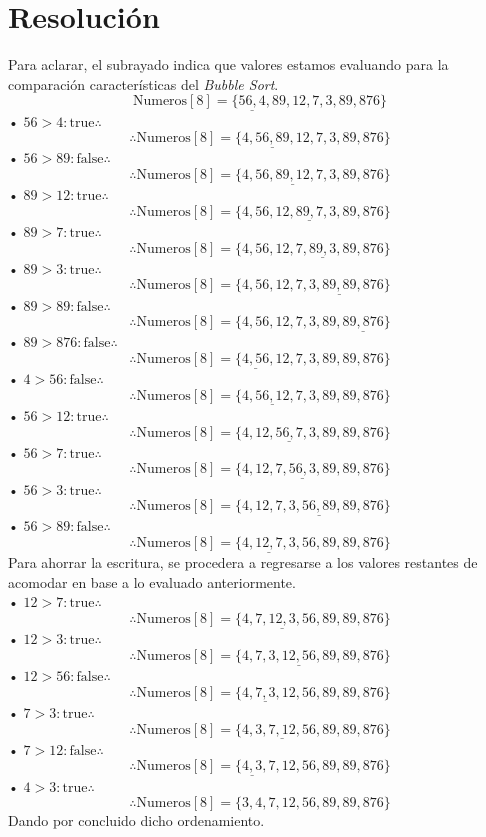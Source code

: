 \documentclass[letterpaper, 12pt]{article}
\begin{document}
    \section{Resolución}
    Para aclarar, el subrayado indica que valores estamos evaluando para la comparación características del \emph{Bubble Sort}.
    \[\text{Numeros}[8]=\{\underline{56, 4}, 89, 12, 7, 3, 89, 876\}\]
    • \(56>4: \text{true} \therefore\)
    \[\therefore \text{Numeros}[8]=\{4, \underline{56, 89}, 12, 7, 3, 89, 876\}\]
    • \(56>89: \text{false} \therefore\)
    \[\therefore \text{Numeros}[8]=\{4, 56, \underline{89, 12}, 7, 3, 89, 876\}\]
    • \(89>12: \text{true} \therefore \)
    \[\therefore \text{Numeros}[8]=\{4, 56, 12, \underline{89, 7}, 3, 89, 876\}\]
    • \(89>7: \text{true} \therefore\)
    \[\therefore \text{Numeros}[8]=\{4, 56, 12, 7, \underline{89, 3}, 89, 876\}\]
    • \(89>3: \text{true} \therefore\)
    \[\therefore \text{Numeros}[8]=\{4, 56, 12, 7, 3, \underline{89, 89}, 876\}\]
    • \(89>89: \text{false} \therefore\)
    \[\therefore \text{Numeros}[8]=\{4, 56, 12, 7, 3, 89, \underline{89, 876}\}\]
    • \(89>876: \text{false} \therefore\)
    \[\therefore \text{Numeros}[8]=\{\underline{4, 56}, 12, 7, 3, 89, 89, 876\}\]
    • \(4>56: \text{false} \therefore\)
    \[\therefore \text{Numeros}[8]=\{4, \underline{56, 12}, 7, 3, 89, 89, 876\}\]
    • \(56>12: \text{true} \therefore\)
    \[\therefore \text{Numeros}[8]=\{4, 12, \underline{56, 7}, 3, 89, 89, 876\}\]
    • \(56>7: \text{true} \therefore\)
    \[\therefore \text{Numeros}[8]=\{4, 12, 7, \underline{56, 3}, 89, 89, 876\}\]
    • \(56>3: \text{true} \therefore\)
    \[\therefore \text{Numeros}[8]=\{4, 12, 7, 3, \underline{56, 89}, 89, 876\}\]
    • \(56>89: \text{false} \therefore\)
    \[\therefore \text{Numeros}[8]=\{4, \underline{12, 7}, 3, 56, 89, 89, 876\}\]
    Para ahorrar la escritura, se procedera a regresarse a los valores restantes de acomodar en base a lo evaluado anteriormente.
    \\\newline• \(12>7: \text{true} \therefore\)
    \[\therefore \text{Numeros}[8]=\{4, 7, \underline{12, 3}, 56, 89, 89, 876\}\]
    • \(12>3: \text{true} \therefore\)
    \[\therefore \text{Numeros}[8]=\{4, 7, 3, \underline{12, 56}, 89, 89, 876\}\]
    • \(12>56: \text{false} \therefore\)
    \[\therefore \text{Numeros}[8]=\{4, \underline{7, 3}, 12, 56, 89, 89, 876\}\]
    • \(7>3: \text{true} \therefore\)
    \[\therefore \text{Numeros}[8]=\{4, 3, \underline{7, 12}, 56, 89, 89, 876\}\]
    • \(7>12: \text{false} \therefore\)
    \[\therefore \text{Numeros}[8]=\{\underline{4, 3}, 7, 12, 56, 89, 89, 876\}\]
    • \(4>3: \text{true} \therefore\)
    \[\therefore \text{Numeros}[8]=\{3, 4, 7, 12, 56, 89, 89, 876\}\]
    Dando por concluido dicho ordenamiento.
\end{document}
